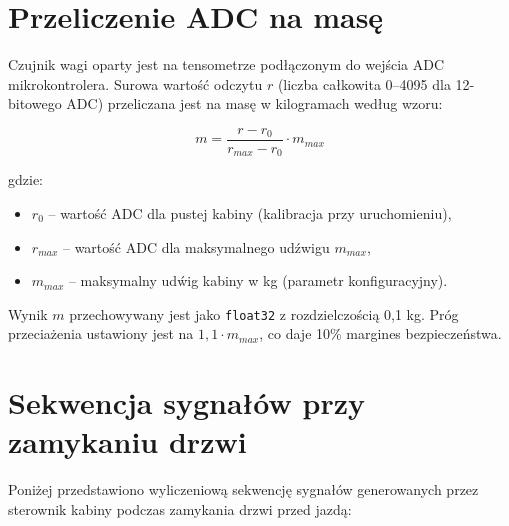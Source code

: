 \documentclass[12pt,a4paper]{article}
\begin{document}
\section{Przeliczenie ADC na mas\k{e}}


Czujnik wagi oparty jest na tensometrze pod\l\k{a}czonym do wej\'scia ADC mikrokontrolera. Surowa warto\'s\'c odczytu $r$ (liczba ca\l kowita 0--4095 dla 12-bitowego ADC) przeliczana jest na mas\k{e} w kilogramach wed\l ug wzoru:

\begin{equation}
    m = \frac{r - r_0}{r_{max} - r_0} \cdot m_{max}
\end{equation}

gdzie:
\begin{itemize}
    \item $r_0$ -- warto\'s\'c ADC dla pustej kabiny (kalibracja przy uruchomieniu),
    \item $r_{max}$ -- warto\'s\'c ADC dla maksymalnego ud\'zwigu $m_{max}$,
    \item $m_{max}$ -- maksymalny ud\'wig kabiny w kg (parametr konfiguracyjny).
\end{itemize}

Wynik $m$ przechowywany jest jako \texttt{float32} z rozdzielczo\'sci\k{a} 0,1 kg. Pr\'og przecia\. zenia ustawiony jest na $1{,}1 \cdot m_{max}$, co daje 10\% margines bezpiecze\'nstwa.


\section{Sekwencja sygna\l\'ow przy zamykaniu drzwi}


Poni\. zej przedstawiono wyliczeniow\k{a} sekwencj\k{e} sygna\l\'ow generowanych przez sterownik kabiny podczas zamykania drzwi przed jazd\k{a}:
\end{document}

